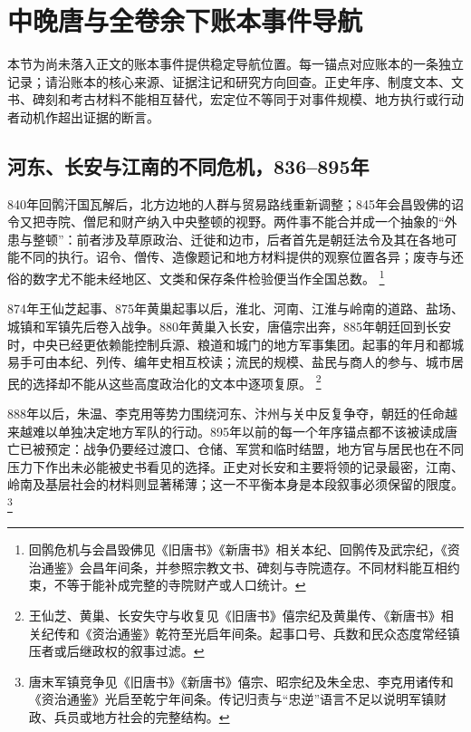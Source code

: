 \section{中晚唐与全卷余下账本事件导航}
\label{sec:event-anchors-final-3}
本节为尚未落入正文的账本事件提供稳定导航位置。每一锚点对应账本的一条独立记录；请沿账本的核心来源、证据注记和研究方向回查。正史年序、制度文本、文书、碑刻和考古材料不能相互替代，宏定位不等同于对事件规模、地方执行或行动者动机作超出证据的断言。

\subsection{河东、长安与江南的不同危机，836--895年}

840年回鹘汗国瓦解后，北方边地的人群与贸易路线重新调整；845年会昌毁佛的诏令又把寺院、僧尼和财产纳入中央整顿的视野。两件事不能合并成一个抽象的“外患与整顿”：前者涉及草原政治、迁徙和边市，后者首先是朝廷法令及其在各地可能不同的执行。诏令、僧传、造像题记和地方材料提供的观察位置各异；废寺与还俗的数字尤不能未经地区、文类和保存条件检验便当作全国总数。%
\footnote{回鹘危机与会昌毁佛见《旧唐书》《新唐书》相关本纪、回鹘传及武宗纪，《资治通鉴》会昌年间条，并参照宗教文书、碑刻与寺院遗存。不同材料能互相约束，不等于能补成完整的寺院财产或人口统计。}

874年王仙芝起事、875年黄巢起事以后，淮北、河南、江淮与岭南的道路、盐场、城镇和军镇先后卷入战争。880年黄巢入长安，唐僖宗出奔，885年朝廷回到长安时，中央已经更依赖能控制兵源、粮道和城门的地方军事集团。起事的年月和都城易手可由本纪、列传、编年史相互校读；流民的规模、盐民与商人的参与、城市居民的选择却不能从这些高度政治化的文本中逐项复原。%
\footnote{王仙芝、黄巢、长安失守与收复见《旧唐书》僖宗纪及黄巢传、《新唐书》相关纪传和《资治通鉴》乾符至光启年间条。起事口号、兵数和民众态度常经镇压者或后继政权的叙事过滤。}

888年以后，朱温、李克用等势力围绕河东、汴州与关中反复争夺，朝廷的任命越来越难以单独决定地方军队的行动。895年以前的每一个年序锚点都不该被读成唐亡已被预定：战争仍要经过渡口、仓储、军赏和临时结盟，地方官与居民也在不同压力下作出未必能被史书看见的选择。正史对长安和主要将领的记录最密，江南、岭南及基层社会的材料则显著稀薄；这一不平衡本身是本段叙事必须保留的限度。%
\footnote{唐末军镇竞争见《旧唐书》《新唐书》僖宗、昭宗纪及朱全忠、李克用诸传和《资治通鉴》光启至乾宁年间条。传记归责与“忠逆”语言不足以说明军镇财政、兵员或地方社会的完整结构。}


